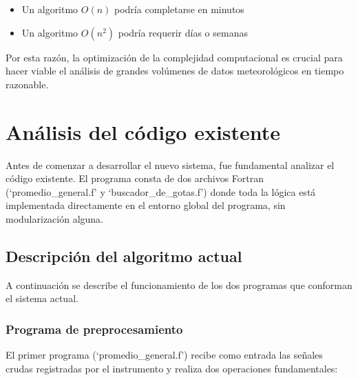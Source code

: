 \documentclass[12pt,a4paper]{article}
\begin{document}
\begin{itemize}
    \item Un algoritmo $O(n)$ podría completarse en minutos
    \item Un algoritmo $O(n^2)$ podría requerir días o semanas
\end{itemize}

Por esta razón, la optimización de la complejidad computacional es crucial para hacer viable el análisis de grandes volúmenes de datos meteorológicos en tiempo razonable.

\section{Análisis del código existente}
\lhead{}

Antes de comenzar a desarrollar el nuevo sistema, fue fundamental analizar el código existente. El programa consta de dos archivos Fortran (`promedio\_general.f' y `buscador\_de\_gotas.f') donde toda la lógica está implementada directamente en el entorno global del programa, sin modularización alguna. 

\subsection{Descripción del algoritmo actual}
A continuación se describe el funcionamiento de los dos programas que conforman el sistema actual.

\subsubsection{Programa de preprocesamiento}

El primer programa (`promedio\_general.f') recibe como entrada las señales crudas registradas por el instrumento y realiza dos operaciones fundamentales:    
\end{document}
